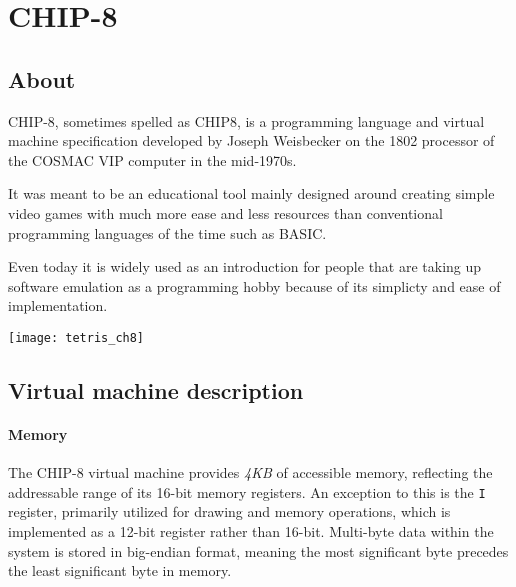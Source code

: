 \chapter{CHIP-8}
\label{chap:ch3}

\section{About}
\label{sec:ch3sec1}

\par CHIP-8, sometimes spelled as CHIP8, is a programming language and virtual machine specification developed by Joseph Weisbecker on the 1802 processor of the COSMAC VIP computer in the mid-1970s.

\par It was meant to be an educational tool mainly designed around creating simple video games with much more ease and less resources than conventional programming languages of the time such as BASIC.

\par Even today it is widely used as an introduction for people that are taking up software emulation as a programming hobby because of its simplicty and ease of implementation.

\vspace{1cm}

\begin{minipage}{\linewidth}
\texttt{[image: tetris\_ch8]}
\end{minipage}

\clearpage

\section{Virtual machine description}
\label{sec:ch3sec2}

\subsubsection{Memory}

\par The CHIP-8 virtual machine provides \textit{4KB} of accessible memory, reflecting the addressable range of its 16-bit memory registers. An exception to this is the \texttt{I} register, primarily utilized for drawing and memory operations, which is implemented as a 12-bit register rather than 16-bit. Multi-byte data within the system is stored in big-endian format, meaning the most significant byte precedes the least significant byte in memory.

